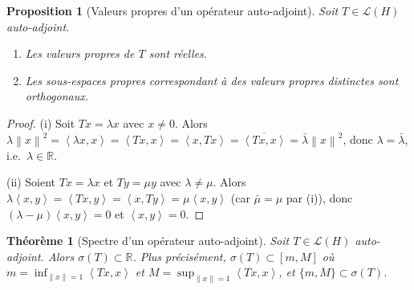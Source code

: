 \documentclass[a4paper,12pt]{book}
\newcommand{\R}{\mathbb{R}}
\newcommand{\norm}[1]{\left\| #1 \right\|}
\newcommand{\inner}[2]{\left\langle #1, #2 \right\rangle}
\theoremstyle{definition}
\theoremstyle{plain}
\newtheorem{theoreme}[definition]{Théorème}
\newtheorem{proposition}[definition]{Proposition}
\theoremstyle{remark}
\begin{document}
\begin{proposition}[Valeurs propres d'un opérateur auto-adjoint]\label{prop:vp-autoadjoint}
Soit $T \in \mathcal{L}(H)$ auto-adjoint.
\begin{enumerate}[label=(\roman*)]
    \item Les valeurs propres de $T$ sont réelles.
    \item Les sous-espaces propres correspondant à des valeurs propres distinctes
          sont orthogonaux.
\end{enumerate}
\end{proposition}

\begin{proof}
(i) Soit $Tx = \lambda x$ avec $x \neq 0$. Alors
$\lambda\norm{x}^2 = \inner{\lambda x}{x} = \inner{Tx}{x} = \inner{x}{Tx}
= \overline{\inner{Tx}{x}} = \bar{\lambda}\norm{x}^2$,
donc $\lambda = \bar{\lambda}$, i.e.\ $\lambda \in \R$.

(ii) Soient $Tx = \lambda x$ et $Ty = \mu y$ avec $\lambda \neq \mu$. Alors
$\lambda\inner{x}{y} = \inner{Tx}{y} = \inner{x}{Ty} = \mu\inner{x}{y}$
(car $\bar{\mu} = \mu$ par (i)), donc $(\lambda - \mu)\inner{x}{y} = 0$ et
$\inner{x}{y} = 0$.
\end{proof}

\begin{theoreme}[Spectre d'un opérateur auto-adjoint]\label{thm:spectre-autoadjoint}
Soit $T \in \mathcal{L}(H)$ auto-adjoint. Alors $\sigma(T) \subset \R$.
Plus précisément, $\sigma(T) \subset [m, M]$ où
$m = \inf_{\norm{x}=1} \inner{Tx}{x}$ et $M = \sup_{\norm{x}=1} \inner{Tx}{x}$,
et $\{m, M\} \subset \sigma(T)$.
\end{theoreme}
\end{document}
